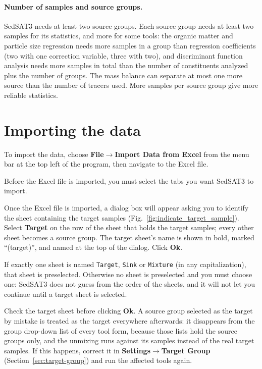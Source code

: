 \documentclass[12pt]{report}
\begin{document}
\paragraph{Number of samples and source groups.} SedSAT3 needs at least two source groups. Each source group needs at least two samples for its statistics, and more for some tools: the organic matter and particle size regression needs more samples in a group than regression coefficients (two with one correction variable, three with two), and discriminant function analysis needs more samples in total than the number of constituents analyzed plus the number of groups. The mass balance can separate at most one more source than the number of tracers used. More samples per source group give more reliable statistics.

\section{Importing the data}\label{sec:importing_data}
To import the data, choose \textbf{File}$\rightarrow$\textbf{Import Data from Excel} from the menu bar at the top left of the program, then navigate to the Excel file.

Before the Excel file is imported, you must select the tabs you want SedSAT3 to import.

Once the Excel file is imported, a dialog box will appear asking you to identify the sheet containing the target samples (Fig.~\ref{fig:indicate_target_sample}). Select \textbf{Target} on the row of the sheet that holds the target samples; every other sheet becomes a source group. The target sheet's name is shown in bold, marked ``(target)'', and named at the top of the dialog. Click \textbf{Ok}.

If exactly one sheet is named \texttt{Target}, \texttt{Sink} or \texttt{Mixture} (in any capitalization), that sheet is preselected. Otherwise no sheet is preselected and you must choose one: SedSAT3 does not guess from the order of the sheets, and it will not let you continue until a target sheet is selected.

\begin{tcolorbox}[colback=yellow!10,colframe=yellow!50!black,title=Note]
Check the target sheet before clicking \textbf{Ok}. A source group selected as the target by mistake is treated as the target everywhere afterwards: it disappears from the group drop-down list of every tool form, because those lists hold the source groups only, and the unmixing runs against its samples instead of the real target samples. If this happens, correct it in \textbf{Settings}$\rightarrow$\textbf{Target Group} (Section~\ref{sec:target-group}) and run the affected tools again.
\end{tcolorbox}
\end{document}
